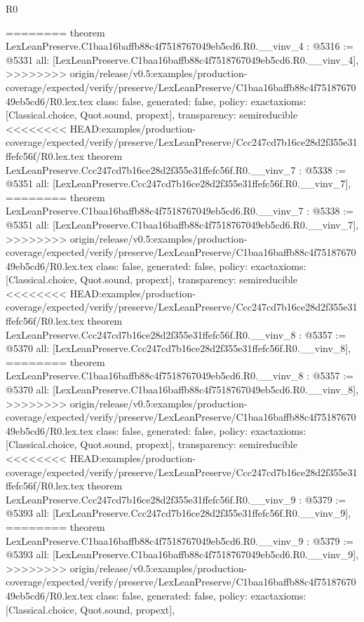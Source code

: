 \begin{lexlean}{R0}
\begin{coremodule}
{{{{{{{{{{{{{{{{{{{{{{{{{{{{{{{{{{{{{{{{{{{{{{{{{{{{{{{{{{{{{{{{{{{{{{{{{{========
theorem LexLeanPreserve.C1baa16baffb88c4f7518767049eb5cd6.R0.__vinv_4 : @5316 := @5331 {
  all: [LexLeanPreserve.C1baa16baffb88c4f7518767049eb5cd6.R0.__vinv_4],
>>>>>>>> origin/release/v0.5:examples/production-coverage/expected/verify/preserve/LexLeanPreserve/C1baa16baffb88c4f7518767049eb5cd6/R0.lex.tex
  class: false,
  generated: false,
  policy: exact{axioms: [Classical.choice, Quot.sound, propext]},
  transparency: semireducible
}
<<<<<<<< HEAD:examples/production-coverage/expected/verify/preserve/LexLeanPreserve/Ccc247cd7b16ce28d2f355e31ffefc56f/R0.lex.tex
theorem LexLeanPreserve.Ccc247cd7b16ce28d2f355e31ffefc56f.R0.__vinv_7 : @5338 := @5351 {
  all: [LexLeanPreserve.Ccc247cd7b16ce28d2f355e31ffefc56f.R0.__vinv_7],
========
theorem LexLeanPreserve.C1baa16baffb88c4f7518767049eb5cd6.R0.__vinv_7 : @5338 := @5351 {
  all: [LexLeanPreserve.C1baa16baffb88c4f7518767049eb5cd6.R0.__vinv_7],
>>>>>>>> origin/release/v0.5:examples/production-coverage/expected/verify/preserve/LexLeanPreserve/C1baa16baffb88c4f7518767049eb5cd6/R0.lex.tex
  class: false,
  generated: false,
  policy: exact{axioms: [Classical.choice, Quot.sound, propext]},
  transparency: semireducible
}
<<<<<<<< HEAD:examples/production-coverage/expected/verify/preserve/LexLeanPreserve/Ccc247cd7b16ce28d2f355e31ffefc56f/R0.lex.tex
theorem LexLeanPreserve.Ccc247cd7b16ce28d2f355e31ffefc56f.R0.__vinv_8 : @5357 := @5370 {
  all: [LexLeanPreserve.Ccc247cd7b16ce28d2f355e31ffefc56f.R0.__vinv_8],
========
theorem LexLeanPreserve.C1baa16baffb88c4f7518767049eb5cd6.R0.__vinv_8 : @5357 := @5370 {
  all: [LexLeanPreserve.C1baa16baffb88c4f7518767049eb5cd6.R0.__vinv_8],
>>>>>>>> origin/release/v0.5:examples/production-coverage/expected/verify/preserve/LexLeanPreserve/C1baa16baffb88c4f7518767049eb5cd6/R0.lex.tex
  class: false,
  generated: false,
  policy: exact{axioms: [Classical.choice, Quot.sound, propext]},
  transparency: semireducible
}
<<<<<<<< HEAD:examples/production-coverage/expected/verify/preserve/LexLeanPreserve/Ccc247cd7b16ce28d2f355e31ffefc56f/R0.lex.tex
theorem LexLeanPreserve.Ccc247cd7b16ce28d2f355e31ffefc56f.R0.__vinv_9 : @5379 := @5393 {
  all: [LexLeanPreserve.Ccc247cd7b16ce28d2f355e31ffefc56f.R0.__vinv_9],
========
theorem LexLeanPreserve.C1baa16baffb88c4f7518767049eb5cd6.R0.__vinv_9 : @5379 := @5393 {
  all: [LexLeanPreserve.C1baa16baffb88c4f7518767049eb5cd6.R0.__vinv_9],
>>>>>>>> origin/release/v0.5:examples/production-coverage/expected/verify/preserve/LexLeanPreserve/C1baa16baffb88c4f7518767049eb5cd6/R0.lex.tex
  class: false,
  generated: false,
  policy: exact{axioms: [Classical.choice, Quot.sound, propext]},
}}}}}}}}}}}}}}}}}}}}}}}}}}}}}}}}}}}}}}}}}}}}}}}}}}}}}}}}}}}}}}}}}}}}}}}}}}}}}}
\end{coremodule}
\end{lexlean}

